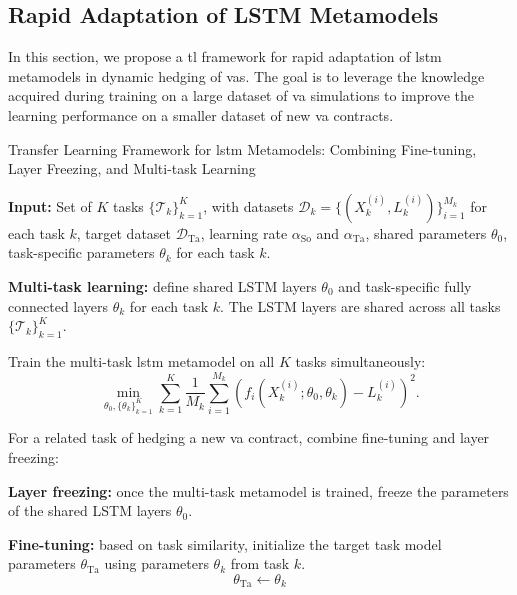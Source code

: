 \subsection{Rapid Adaptation of LSTM Metamodels} \label{sec3:transfer_learning}

In this section, we propose a \gls{tl} framework for rapid adaptation of \gls{lstm} metamodels in dynamic hedging of \gls{va}s.
The goal is to leverage the knowledge acquired during training on a large dataset of \gls{va} simulations to improve the learning performance on a smaller dataset of new \gls{va} contracts.


\begin{algorithm}
    \caption{Transfer Learning Framework for \gls{lstm} Metamodels: Combining Fine-tuning, Layer Freezing, and Multi-task Learning}
    \begin{algorithmic}[1] \label{alg3:combined}
        \STATE \textbf{Input:} Set of $K$ tasks $\{\mathcal{T}_k\}_{k=1}^K$, with datasets $\mathcal{D}_k = \{(X_k^{(i)}, L_k^{(i)})\}_{i=1}^{M_k}$ for each task $k$, target dataset $\mathcal{D}_{\text{Ta}}$, learning rate $\alpha_{\text{So}}$ and $\alpha_{\text{Ta}}$, shared parameters $\theta_0$, task-specific parameters $\theta_k$ for each task $k$.
        
        \STATE \textbf{Multi-task learning:} define shared LSTM layers $\theta_0$ and task-specific fully connected layers $\theta_k$ for each task $k$. The LSTM layers are shared across all tasks $\{\mathcal{T}_k\}_{k=1}^K$.
        
        \STATE Train the multi-task \gls{lstm} metamodel on all $K$ tasks simultaneously:
        \begin{equation}
            \min_{\theta_0, \{\theta_k\}_{k=1}^K} \sum_{k=1}^K \frac{1}{M_k} \sum_{i=1}^{M_k} \left( f_i(X_k^{(i)}; \theta_0, \theta_k) - L_k^{(i)} \right)^2.
        \end{equation}
        
        \STATE For a related task of hedging a new \gls{va} contract, combine fine-tuning and layer freezing:

        \STATE \textbf{Layer freezing:} once the multi-task metamodel is trained, freeze the parameters of the shared LSTM layers $\theta_0$.
        
        \STATE \textbf{Fine-tuning:}  based on task similarity, initialize the target task model parameters $\theta_{\text{Ta}}$ using parameters $\theta_k$ from task $k$.
        \[
        \theta_{\text{Ta}} \gets \theta_k 
        \]
        

\end{algorithmic}
\end{algorithm}
